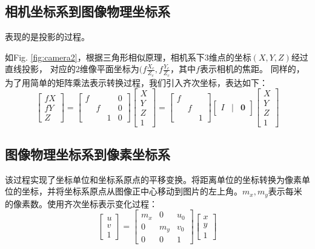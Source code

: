 \documentclass[UTF8]{ctexart}
\begin{document}
\begin{CJK*}{UTF8}{gbsn}
\subsection{相机坐标系到图像物理坐标系}
表现的是投影的过程。

如Fig. \ref{fig:camera2}，根据三角形相似原理，相机系下3维点的坐标$(X,Y,Z)$经过直线投影，
对应的2维像平面坐标为$(f\frac{X_c}{Z_c}, f\frac{Y_c}{Z_c}$，其中$f$表示相机的焦距。
同样的，为了用简单的矩阵乘法表示转换过程，我们引入齐次坐标，表达如下：
\begin{equation}
\label{eq:in1}
\begin{bmatrix}
fX \\ fY \\ Z
\end{bmatrix} = 
\begin{bmatrix}
f &   &   & 0 \\
  & f &   & 0 \\
  &   & 1 & 0
\end{bmatrix} \begin{bmatrix} X \\ Y \\ Z \\ 1 \end{bmatrix}
=
\begin{bmatrix}
f &   &   \\
  & f &   \\
  &   & 1
\end{bmatrix} \begin{bmatrix}  I & | & \mathbf{0}\end{bmatrix} \begin{bmatrix} X \\ Y \\ Z \\ 1 \end{bmatrix}
\end{equation}

\subsection{图像物理坐标系到像素坐标系}
该过程实现了坐标单位和坐标系原点的平移变换。将距离单位的坐标转换为像素单位的坐标，并将坐标系原点从图像正中心移动到图片的左上角。$m_x, m_y$表示每米的像素数。使用齐次坐标表示变化过程：
\begin{equation}
\begin{bmatrix}
u \\ v \\ 1
\end{bmatrix}=
\begin{bmatrix}
m_x & 0 & u_0 \\
0 & m_y & v_0 \\
0 & 0 & 1
\end{bmatrix} \begin{bmatrix} x \\ y \\ 1 \end{bmatrix}
\label{eq:in2}
\end{equation}


\end{CJK*}
\end{document}

